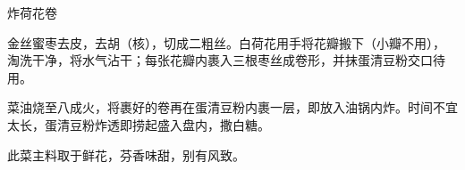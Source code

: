 \begin{recipe}{炸荷花卷}

\ingredients


\preparation

\step 金丝蜜枣去皮，去胡（核），切成二粗丝。白荷花用手将花瓣搬下（小瓣不用），
淘洗干净，将水气沾干；每张花瓣内裹入三根枣丝成卷形，并抹蛋清豆粉交口待用。

\step 菜油烧至八成火，将裹好的卷再在蛋清豆粉内裹一层，即放入油锅内炸。时间不宜
太长，蛋清豆粉炸透即捞起盛入盘内，撒白糖。

\features

此菜主料取于鲜花，芬香味甜，别有风致。

\end{recipe}

